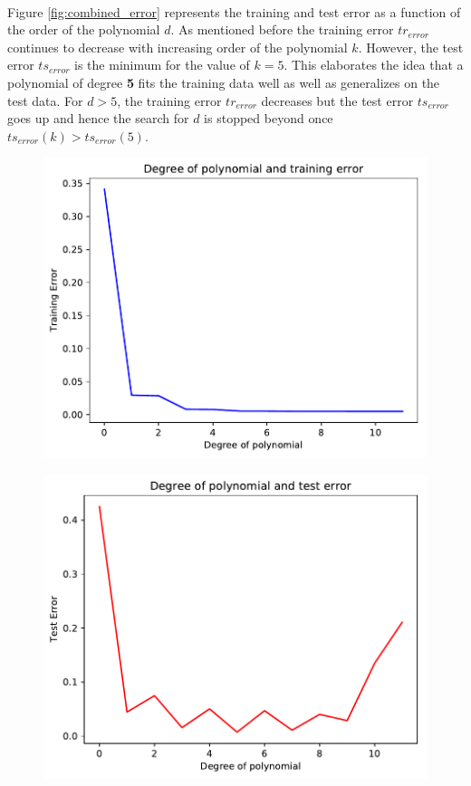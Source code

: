 \documentclass{article}
\begin{document}
\\
Figure \ref{fig:combined_error} represents the training and test error as a function of the order of the polynomial $d$. As mentioned before the training error $tr_{error}$ continues to decrease with increasing order of the polynomial $k$. However, the test error $ts_{error}$ is the minimum for the value of $k = 5$. This elaborates the idea that a polynomial of degree \textbf {5} fits the training data well as well as generalizes on the test data. For $d > 5$, the training error $tr_{error}$ decreases but the test error $ts_{error}$ goes up and hence the search for $d$ is stopped beyond once $ts_{error}(k) > ts_{error}(5)$.

\begin{figure}
\centering
\begin{minipage}{.56\textwidth}
  \centering
  \includegraphics[scale = 0.5]{training_error.pdf}
  \label{fig:demo}
\end{minipage}%
\begin{minipage}{.6\textwidth}
  \centering
  \includegraphics[trim = 10cm 0cm 0cm 0cm,scale=0.5]{test_error.pdf}
  \label{fig:model}
  

\end{minipage}
\end{figure}
\end{document}

